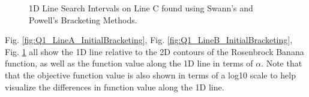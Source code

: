 \documentclass{article}
\begin{document}
    \begin{figure}[H]
        \centering
        
        \caption{1D Line Search Intervals on Line C found using Swann's and Powell's Bracketing Methods.}
        \label{fig:Q1_LineC_InitialBracketing}
    \end{figure}

    Fig. \ref{fig:Q1_LineA_InitialBracketing}, Fig. \ref{fig:Q1_LineB_InitialBracketing}, Fig. \ref{fig:Q1_LineC_InitialBracketing} all show the 1D line relative to the 2D contours of the Rosenbrock Banana function, as well as the function value along the 1D line in terms of $\alpha$.
    Note that that the objective function value is also shown in terms of a log10 scale to help visualize the differences in function value along the 1D line.
\end{document}
